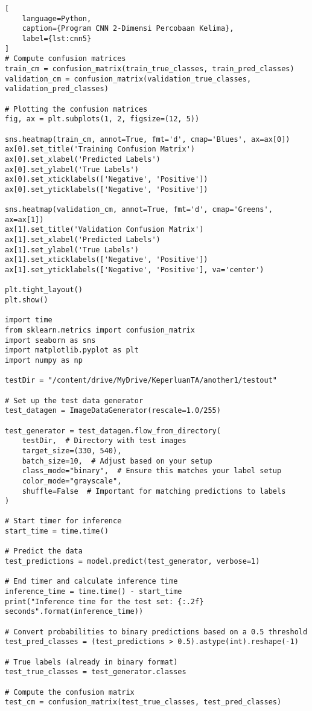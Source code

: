 \begin{lstlisting}[
    language=Python,
    caption={Program CNN 2-Dimensi Percobaan Kelima},
    label={lst:cnn5}
]
# Compute confusion matrices
train_cm = confusion_matrix(train_true_classes, train_pred_classes)
validation_cm = confusion_matrix(validation_true_classes, validation_pred_classes)

# Plotting the confusion matrices
fig, ax = plt.subplots(1, 2, figsize=(12, 5))

sns.heatmap(train_cm, annot=True, fmt='d', cmap='Blues', ax=ax[0])
ax[0].set_title('Training Confusion Matrix')
ax[0].set_xlabel('Predicted Labels')
ax[0].set_ylabel('True Labels')
ax[0].set_xticklabels(['Negative', 'Positive'])
ax[0].set_yticklabels(['Negative', 'Positive'])

sns.heatmap(validation_cm, annot=True, fmt='d', cmap='Greens', ax=ax[1])
ax[1].set_title('Validation Confusion Matrix')
ax[1].set_xlabel('Predicted Labels')
ax[1].set_ylabel('True Labels')
ax[1].set_xticklabels(['Negative', 'Positive'])
ax[1].set_yticklabels(['Negative', 'Positive'], va='center')

plt.tight_layout()
plt.show()

import time
from sklearn.metrics import confusion_matrix
import seaborn as sns
import matplotlib.pyplot as plt
import numpy as np

testDir = "/content/drive/MyDrive/KeperluanTA/another1/testout"

# Set up the test data generator
test_datagen = ImageDataGenerator(rescale=1.0/255)

test_generator = test_datagen.flow_from_directory(
    testDir,  # Directory with test images
    target_size=(330, 540),
    batch_size=10,  # Adjust based on your setup
    class_mode="binary",  # Ensure this matches your label setup
    color_mode="grayscale",
    shuffle=False  # Important for matching predictions to labels
)

# Start timer for inference
start_time = time.time()

# Predict the data
test_predictions = model.predict(test_generator, verbose=1)

# End timer and calculate inference time
inference_time = time.time() - start_time
print("Inference time for the test set: {:.2f} seconds".format(inference_time))

# Convert probabilities to binary predictions based on a 0.5 threshold
test_pred_classes = (test_predictions > 0.5).astype(int).reshape(-1)

# True labels (already in binary format)
test_true_classes = test_generator.classes

# Compute the confusion matrix
test_cm = confusion_matrix(test_true_classes, test_pred_classes)


\end{lstlisting}
